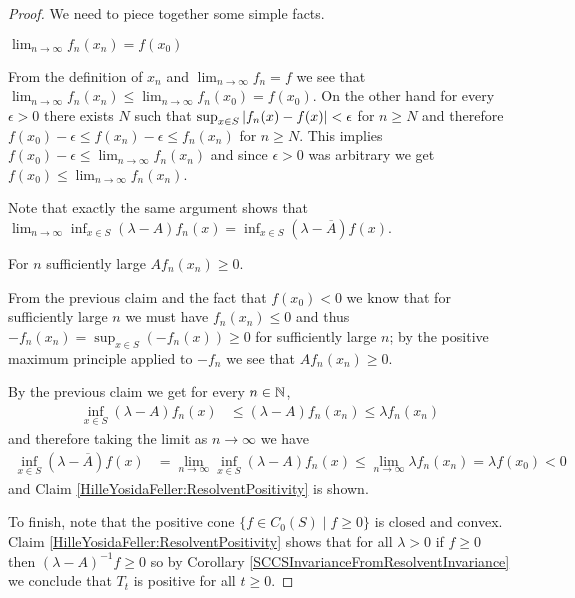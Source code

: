 \begin{proof}
We need to piece together some simple facts.
\begin{clm}$\lim_{n \to \infty} f_n(x_n) = f(x_0)$
\end{clm}
From the definition of $x_n$ and $\lim_{n \to \infty} f_n = f$ we see that $\lim_{n \to \infty} f_n(x_n) \leq \lim_{n \to \infty} f_n(x_0) = f(x_0)$.  On the other hand for every $\epsilon > 0$
there exists $N$ such that $\sup_{x \in S} \left \vert f_n(x) - f(x) \right \vert < \epsilon$ for $n \geq N$ and therefore $f(x_0) - \epsilon \leq f(x_n) - \epsilon \leq f_n(x_n)$ for $n \geq N$.  This implies $f(x_0) - \epsilon \leq \lim_{n \to \infty} f_n(x_n)$ and since $\epsilon >0$ was arbitrary we get $f(x_0) \leq \lim_{n \to \infty} f_n(x_n)$.

Note that exactly the same argument shows that $\lim_{n \to \infty} \inf_{x \in S} (\lambda - A) f_n(x) =  \inf_{x \in S} (\lambda - \overline{A}) f(x)$.

\begin{clm}For $n$ sufficiently large $A f_n (x_n) \geq 0$.
\end{clm}
From the previous claim and the fact that $f(x_0) < 0$ we know that for sufficiently large $n$ we must have $f_n(x_n) \leq 0$ and thus $-f_n(x_n) = \sup_{x \in S} (-f_n(x)) 
\geq 0$ for sufficiently large $n$; by the positive maximum principle applied to $-f_n$ we see that $A f_n (x_n) \geq 0$.  

By the previous claim we get for every $n \in \mathbb{N}$,
\begin{align*}
\inf_{x \in S} (\lambda - A) f_n(x) &\leq (\lambda - A) f_n(x_n) \leq \lambda f_n(x_n)
\end{align*}
and therefore taking the limit as $n \to \infty$ we have
\begin{align*}
\inf_{x \in S} (\lambda - \overline{A}) f(x)  &= \lim_{n \to \infty} \inf_{x \in S} (\lambda - A) f_n(x) \leq \lim_{n \to \infty} \lambda f_n(x_n) = \lambda f(x_0) < 0
\end{align*}
and Claim \ref{HilleYosidaFeller:ResolventPositivity} is shown.  

To finish, note that the positive cone $\lbrace f \in C_0(S) \mid f \geq 0 \rbrace$ is closed and convex.  Claim \ref{HilleYosidaFeller:ResolventPositivity} shows that for all $\lambda > 0$ if $f \geq 0$ then $(\lambda - A)^{-1} f \geq 0$ so by Corollary \ref{SCCSInvarianceFromResolventInvariance} we conclude that $T_t$ is positive for all $t \geq 0$.
\end{proof}

